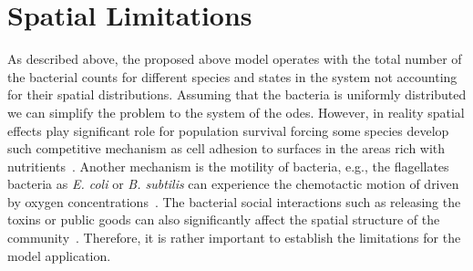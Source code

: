 \documentclass[10pt,A4paper]{article}
\begin{document}
\section{Spatial Limitations}
As described above, the proposed above model operates with the total number of the bacterial counts for different species and states in the system not accounting for their spatial distributions.
Assuming that the bacteria is uniformly distributed we can simplify the problem to the system of the \acp{ode}.
However, in reality spatial effects play significant role for population survival forcing some species develop such competitive mechanism as cell adhesion to surfaces in the areas rich with nutritients~\cite{htuson_bacteriasurface_2013}.
Another mechanism is the motility of bacteria, e.g., the flagellates bacteria as \textit{E. coli} or \textit{B. subtilis} can experience the chemotactic motion of driven by oxygen concentrations~\cite{decoene_microscopic_2011}.
The bacterial social interactions such as releasing the toxins or public goods can also significantly affect the spatial structure of the community~\cite{blanchard_bacterial_2015}.
Therefore, it is rather important to establish the limitations for the model application.\\
\end{document}
